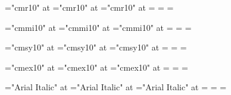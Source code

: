 \font\1="cmr10" at \largefont
\font\2="cmr10" at \normalfont
\font\3="cmr10" at \smallfont
{}=\1 =\2 =\3
\def\rm{\fam=0}

\def\hugemi   {\font\zfontz="cmmi10" at \hugefont   \zfontz}
\def\largemi  {\font\zfontz="cmmi10" at \largefont  \zfontz}
\def\normalmi {\font\zfontz="cmmi10" at \normalfont \zfontz}
\def\smallmi  {\font\zfontz="cmmi10" at \smallfont  \zfontz}
\def\tinymi   {\font\zfontz="cmmi10" at \tinyfont   \zfontz}

\font\1="cmmi10" at \largefont
\font\2="cmmi10" at \normalfont
\font\3="cmmi10" at \smallfont
{}=\1 =\2 =\3
\def\mit{\fam=1}

\def\hugesy   {\font\zfontz="cmsy10" at \hugefont   \zfontz}
\def\largesy  {\font\zfontz="cmsy10" at \largefont  \zfontz}
\def\normalsy {\font\zfontz="cmsy10" at \normalfont \zfontz}
\def\smallsy  {\font\zfontz="cmsy10" at \smallfont  \zfontz}
\def\tinysy   {\font\zfontz="cmsy10" at \tinyfont   \zfontz}

\font\1="cmsy10" at \largefont
\font\2="cmsy10" at \normalfont
\font\3="cmsy10" at \smallfont
{}=\1 =\2 =\3
\def\cal{\fam=2}

\def\hugeex   {\font\zfontz="cmex10" at \hugefont   \zfontz}
\def\largeex  {\font\zfontz="cmex10" at \largefont  \zfontz}
\def\normalex {\font\zfontz="cmex10" at \normalfont \zfontz}
\def\smallex  {\font\zfontz="cmex10" at \smallfont  \zfontz}
\def\tinyex   {\font\zfontz="cmex10" at \tinyfont   \zfontz}

\font\1="cmex10" at \largefont
\font\2="cmex10" at \normalfont
\font\3="cmex10" at \smallfont
{}=\1 =\2 =\3

\def\giantit  {\font\zfontz="Arial Italic" at \giantfont  \zfontz}
\def\hugeit   {\font\zfontz="Arial Italic" at \hugefont   \zfontz}
\def\largeit  {\font\zfontz="Arial Italic" at \largefont  \zfontz}
\def\normalit {\font\zfontz="Arial Italic" at \normalfont \zfontz}
\def\smallit  {\font\zfontz="Arial Italic" at \smallfont  \zfontz}
\def\tinyit   {\font\zfontz="Arial Italic" at \tinyfont   \zfontz}

\font\1="Arial Italic" at \largefont
\font\2="Arial Italic" at \normalfont
\font\3="Arial Italic" at \smallfont
{}=\1 =\2 =\3
\def\it{\fam=4}

